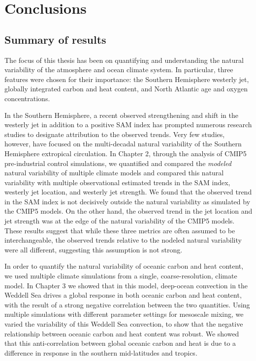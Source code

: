 \chapter{Conclusions}
\label{cha:conclusions}

\section{Summary of results}

The focus of this thesis has been on quantifying and understanding the natural
variability of the atmosphere and ocean climate system. In particular, three features
were chosen for their importance: the Southern Hemisphere westerly jet, globally
integrated carbon and heat content, and North Atlantic age and oxygen concentrations.

In the Southern Hemisphere, a recent observed strengthening and shift in the westerly
jet in addition to a positive SAM index has prompted numerous research studies to
designate attribution to the observed trends. Very few studies, however, have
focused on the multi-decadal natural variability of the Southern Hemisphere
extropical circulation. In Chapter 2, through the analysis of CMIP5 pre-industrial control
simulations, we quantified and compared the \textit{modeled} natural variability
of multiple climate models and compared this natural variability with multiple
observational estimated trends in the SAM index, westerly jet location, and
westerly jet strength. We found that the observed trend in the SAM index is not
decisively outside the natural variability as simulated by the CMIP5 models.
On the other hand, the observed trend in the jet location and jet strength was
at the edge of the natural variability of the CMIP5 models. These results suggest
that while these three metrics are often assumed to be interchangeable, the observed
trends relative to the nodeled natural variability were all different, suggesting
this assumption is not strong.

In order to quantify the natural variability of oceanic carbon and heat content,
we used multiple climate simulations from a single, coarse-resolution, climate model.
In Chapter 3 we showed that in this model, deep-ocean convection in the Weddell Sea
drives a global response in both oceanic carbon and heat content, with the result
of a strong negative correlation between the two quantities. Using multiple simulations
with different parameter settings for mesoscale mixing, we varied the variability
of this Weddell Sea convection, to show that the negative relationship between oceanic
carbon and heat content was robust. We showed that this anti-correlation
between global oceanic carbon and heat is due to a difference in response in the
southern mid-latitudes and tropics.

